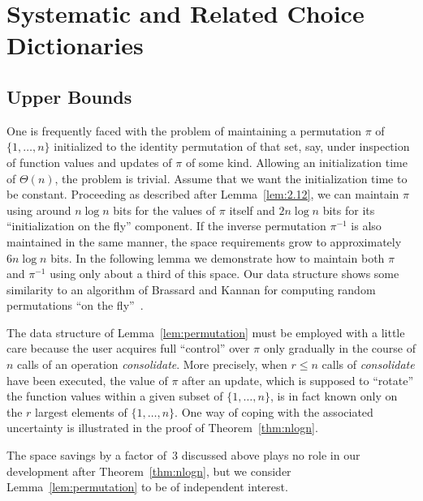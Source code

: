 \documentclass[envcountsame,envcountsect,undated,nolinenumbers]{lnthi}
\def\Tvn#1{\hbox{\textit{#1\/}}}
\begin{document}
\section{Systematic and Related Choice Dictionaries}
\label{sec:systematic}

\subsection{Upper Bounds}

One is frequently faced with the problem of
maintaining a permutation $\pi$ of $\{1,\ldots,n\}$
initialized to the identity permutation of that
set, say, under inspection of function values
and updates of $\pi$ of some kind.
Allowing an initialization time of $\Theta(n)$,
the problem is trivial.
Assume that we want the initialization time to be constant.
Proceeding as described after Lemma~\ref{lem:2.12},
we can maintain $\pi$ using around $n\log n$ bits
for the values of $\pi$ itself and $2 n\log n$ bits 
for its ``initialization on the fly'' component.
If the inverse permutation $\pi^{-1}$ is also
maintained in the same manner, the space
requirements grow to approximately
$6 n\log n$ bits.
In the following lemma we demonstrate how to maintain
both $\pi$ and $\pi^{-1}$ using only about
a third of this space.
Our data structure shows some
similarity to an algorithm of Brassard and Kannan
for computing random permutations
``on the fly''~\cite{BraK88}.

The data structure of
Lemma~\ref{lem:permutation}
must be employed with a little care because the
user acquires full ``control'' over $\pi$ only
gradually in the course of
$n$ calls of an operation \Tvn{consolidate}.
More precisely, when $r\le n$ calls of \Tvn{consolidate}
have been executed, the value of $\pi$ after
an update, which is supposed to ``rotate'' 
the function values within a
given subset of $\{1,\ldots,n\}$,
is in fact known only on the $r$ largest elements
of $\{1,\ldots,n\}$.
One way of coping with the associated uncertainty
is illustrated in the
proof of Theorem~\ref{thm:nlogn}.

The space savings by a factor of~3 discussed
above plays no role in our development after
Theorem~\ref{thm:nlogn}, but we consider
Lemma~\ref{lem:permutation} to be
of independent interest.
\end{document}

